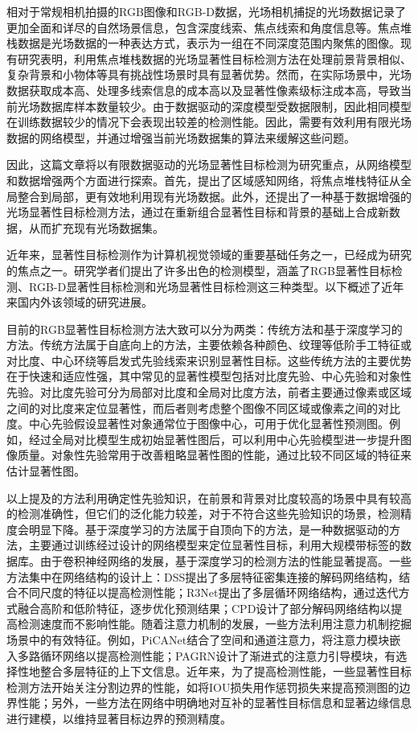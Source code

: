 相对于常规相机拍摄的RGB图像和RGB-D数据，光场相机捕捉的光场数据记录了更加全面和详尽的自然场景信息，包含深度线索、焦点线索和角度信息等。焦点堆栈数据是光场数据的一种表达方式，表示为一组在不同深度范围内聚焦的图像。现有研究表明，利用焦点堆栈数据的光场显著性目标检测方法在处理前景背景相似、复杂背景和小物体等具有挑战性场景时具有显著优势。然而，在实际场景中，光场数据获取成本高、处理多线索信息的成本高以及显著性像素级标注成本高，导致当前光场数据库样本数量较少。由于数据驱动的深度模型受数据限制，因此相同模型在训练数据较少的情况下会表现出较差的检测性能。因此，需要有效利用有限光场数据的网络模型，并通过增强当前光场数据集的算法来缓解这些问题。

因此，这篇文章将以有限数据驱动的光场显著性目标检测为研究重点，从网络模型和数据增强两个方面进行探索。首先，提出了区域感知网络，将焦点堆栈特征从全局整合到局部，更有效地利用现有光场数据。此外，还提出了一种基于数据增强的光场显著性目标检测方法，通过在重新组合显著性目标和背景的基础上合成新数据，从而扩充现有光场数据集。



近年来，显著性目标检测作为计算机视觉领域的重要基础任务之一，已经成为研究的焦点之一。研究学者们提出了许多出色的检测模型，涵盖了RGB显著性目标检测、RGB-D显著性目标检测和光场显著性目标检测这三种类型。以下概述了近年来国内外该领域的研究进展。



目前的RGB显著性目标检测方法大致可以分为两类：传统方法和基于深度学习的方法。传统方法属于自底向上的方法，主要依赖各种颜色、纹理等低阶手工特征或对比度、中心环绕等启发式先验线索来识别显著性目标。这些传统方法的主要优势在于快速和适应性强，其中常见的显著性模型包括对比度先验、中心先验和对象性先验。对比度先验可分为局部对比度和全局对比度方法，前者主要通过像素或区域之间的对比度来定位显著性，而后者则考虑整个图像不同区域或像素之间的对比度。中心先验假设显著性对象通常位于图像中心，可用于优化显著性预测图。例如，经过全局对比模型生成初始显著性图后，可以利用中心先验模型进一步提升图像质量。对象性先验常用于改善粗略显著性图的性能，通过比较不同区域的特征来估计显著性图。


以上提及的方法利用确定性先验知识，在前景和背景对比度较高的场景中具有较高的检测准确性，但它们的泛化能力较差，对于不符合这些先验知识的场景，检测精度会明显下降。基于深度学习的方法属于自顶向下的方法，是一种数据驱动的方法，主要通过训练经过设计的网络模型来定位显著性目标，利用大规模带标签的数据库。由于卷积神经网络的发展，基于深度学习的检测方法的性能显著提高。一些方法集中在网络结构的设计上：DSS提出了多层特征密集连接的解码网络结构，结合不同尺度的特征以提高检测性能；R3Net提出了多层循环网络结构，通过迭代方式融合高阶和低阶特征，逐步优化预测结果；CPD设计了部分解码网络结构以提高检测速度而不影响性能。随着注意力机制的发展，一些方法利用注意力机制挖掘场景中的有效特征。例如，PiCANet结合了空间和通道注意力，将注意力模块嵌入多路循环网络以提高检测性能；PAGRN设计了渐进式的注意力引导模块，有选择性地整合多层特征的上下文信息。近年来，为了提高检测性能，一些显著性目标检测方法开始关注分割边界的性能，如将IOU损失用作惩罚损失来提高预测图的边界性能；另外，一些方法在网络中明确地对互补的显著性目标信息和显著边缘信息进行建模，以维持显著目标边界的预测精度。


